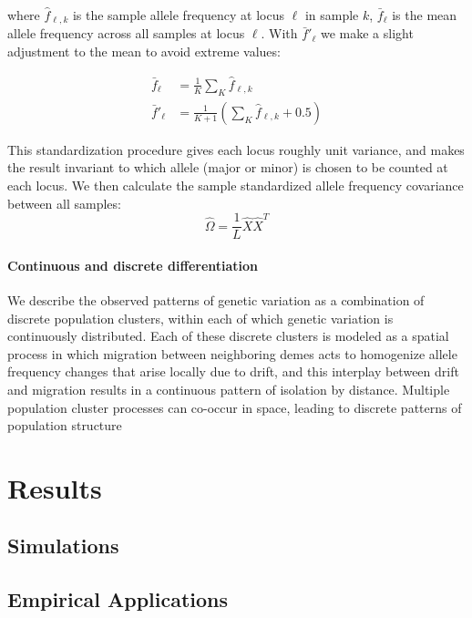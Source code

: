 \documentclass[12pt]{article}
\begin{document}
where $\hat{f}_{\ell,k}$ is the sample allele frequency at locus $\ell$ in sample $k$,
$\bar{f}_{\ell}$ is the mean allele frequency across all samples at locus $\ell$.
With $\bar{f}'_{\ell}$ we make a slight adjustment to the mean to avoid extreme values:

\begin{align}
\bar{f}_{\ell} &= \frac{1}{K}\sum\limits_{K}\hat{f}_{\ell,k}\\
\bar{f}'_{\ell} &= \frac{1}{K+1}\left(\sum\limits_{K}\hat{f}_{\ell,k}+ 0.5\right)
\end{align}

This standardization procedure gives each locus roughly unit variance, 
and makes the result invariant to which allele (major or minor) is chosen to be counted at each locus.
We then calculate the sample standardized allele frequency covariance between all samples:
\begin{equation}
\widehat{\Omega} = \frac{1}{L}  \hat{X}\hat{X}^T
\end{equation}

\paragraph{Continuous and discrete differentiation}
We describe the observed patterns of genetic variation as a combination of discrete population clusters,
within each of which genetic variation is continuously distributed.
Each of these discrete clusters is modeled as a spatial process
in which migration between neighboring demes acts 
to homogenize allele frequency changes that arise locally due to drift,
and this interplay between drift and migration 
results in a continuous pattern of isolation by distance.
Multiple population cluster processes can co-occur in space, 
leading to discrete patterns of population structure


\section*{Results}

\subsection*{Simulations}

\subsection*{Empirical Applications}
\end{document}

